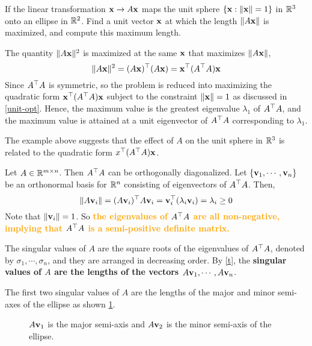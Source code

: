     \begin{Ex}
      If the linear transformation $\mathbf{x}\to A\mathbf{x}$ maps the unit sphere $\{ \mathbf{x}: \lVert \mathbf{x} \rVert = 1 \}$ in $\mathbb{R}^3$ onto an ellipse in $\mathbb{R}^2$. Find a unit vector $\mathbf{x}$ at which the length $\lVert A\mathbf{x} \rVert$ is maximized, and compute this maximum length.
      \begin{sol}
          The quantity $\lVert A\mathbf{x} \rVert^2$ is maximized at the same $\mathbf{x}$ that maximizes $\lVert A\mathbf{x} \rVert$, 
          \begin{equation*}
              \lVert A\mathbf{x} \rVert^2 = (A\mathbf{x})^{\top}(A\mathbf{x}) = \mathbf{x}^{\top}(A^{\top}A)\mathbf{x}
          \end{equation*} Since $A^{\top}A$ is symmetric, so the problem is reduced into maximizing the quadratic form $\mathbf{x}^{\top}(A^{\top}A)\mathbf{x}$ subject to the constraint $\lVert \mathbf{x} \rVert = 1$ as discussed in \cref{unit-opt}. Hence, the maximum value is the greatest eigenvalue $\lambda_1$ of $A^{\top}A$, and the maximum value is attained at a unit eigenvector of $A^{\top}A$ corresponding to $\lambda_1$.
      \end{sol}
    \end{Ex}
    The example above suggests that the effect of $A$ on the unit sphere in $\mathbb{R}^3$ is related to the quadratic form $x^{\top}(A^{\top}A)\mathbf{x}$.\par 
    Let $A\in\mathbb{R}^{m\times n}$. Then $A^{\top}A$ can be orthogonally diagonalized. Let $\{\mathbf{v}_1, \cdots, \mathbf{v}_n \}$ be an orthonormal basis for $\mathbb{R}^n$ consisting of eigenvectors of $A^{\top}A$. Then,
    \begin{equation}\label{t}
        \lVert A\mathbf{v}_i \rVert = (A\mathbf{v}_i)^{\top}A\mathbf{v}_i = \mathbf{v}_i^{\top}(\lambda_i \mathbf{v}_i) = \lambda_i\geq 0
    \end{equation}Note that $\lVert \mathbf{v}_i \rVert = 1$. So \textbf{\textcolor{orange}{the eigenvalues of $A^{\top}A$ are all non-negative, implying that $A^{\top}A$ is a semi-positive definite matrix.}}
    \begin{Def}
        The singular values of $A$ are the square roots of the eigenvalues of $A^{\top}A$, denoted by $\sigma_1, \cdots, \sigma_n$, and they are arranged in decreasing order. By \cref{t}, the \textbf{singular values of $A$ are the lengths of the vectors $A\mathbf{v}_1, \cdots, A\mathbf{v}_n$}. 
        \begin{Rem}
            The first two singular values of $A$ are the lengths of the major and minor semi-axes of the ellipse as shown \cref{singular-ellipse}.
        \end{Rem}
    \end{Def}
    \begin{figure}
        \centering
        
        \caption{$A\mathbf{v}_1$ is the major semi-axis and $A\mathbf{v}_2$ is the minor semi-axis of the ellipse.}
        \label{singular-ellipse}
    \end{figure}

